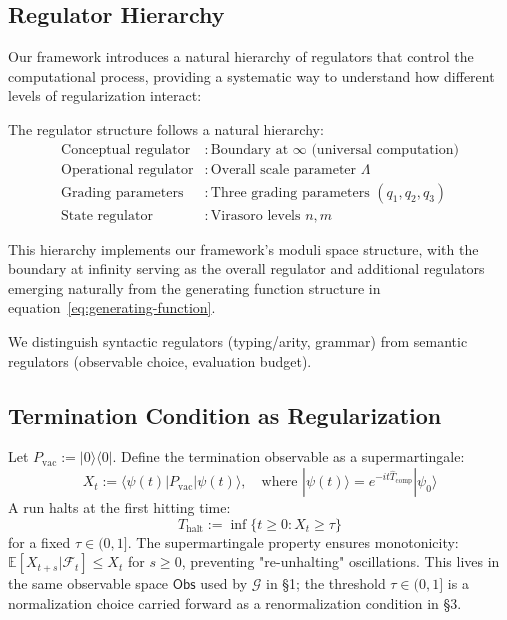 \subsection{Regulator Hierarchy}

Our framework introduces a natural hierarchy of regulators that control the computational process, providing a systematic way to understand how different levels of regularization interact:

\begin{definition}
\label{def:regulator-hierarchy}
The regulator structure follows a natural hierarchy:
\begin{align}
\text{Conceptual regulator} &: \text{Boundary at } \infty \text{ (universal computation)} \\
\text{Operational regulator} &: \text{Overall scale parameter } \Lambda \\
\text{Grading parameters} &: \text{Three grading parameters } (q_1, q_2, q_3) \\
\text{State regulator} &: \text{Virasoro levels } n, m
\end{align}
\end{definition}

This hierarchy implements our framework's moduli space structure, with the boundary at infinity serving as the overall regulator and additional regulators emerging naturally from the generating function structure in equation~\eqref{eq:generating-function}.

We distinguish syntactic regulators (typing/arity, grammar) from semantic regulators (observable choice, evaluation budget).

\subsection{Termination Condition as Regularization}

\begin{definition}
\label{def:termination-observable}
Let $P_{\mathrm{vac}}:=|0\rangle\langle 0|$. Define the termination observable as a supermartingale:
\[
X_t := \langle \psi(t)|P_{\mathrm{vac}}|\psi(t)\rangle, \quad \text{where } |\psi(t)\rangle=e^{-it\hat T_{\mathrm{comp}}}|\psi_0\rangle
\]
A run halts at the first hitting time:
\[
T_{\text{halt}} := \inf\{t \geq 0 : X_t \geq \tau\}
\]
for a fixed $\tau\in(0,1]$. The supermartingale property ensures monotonicity: $\mathbb{E}[X_{t+s}|\mathcal{F}_t] \leq X_t$ for $s \geq 0$, preventing "re-unhalting" oscillations. This lives in the same observable space $\mathsf{Obs}$ used by $\mathcal{G}$ in §1; the threshold $\tau\in(0,1]$ is a normalization choice carried forward as a renormalization condition in §3.
\end{definition}


